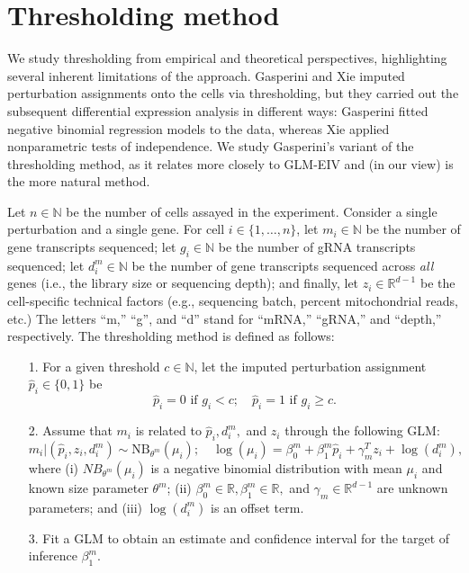 \documentclass[12pt]{article}
\begin{document}
\section{Thresholding method}
We study thresholding from empirical and theoretical perspectives, highlighting several inherent limitations of the approach. Gasperini and Xie imputed perturbation assignments onto the cells via thresholding, but they carried out the subsequent differential expression analysis in different ways: Gasperini fitted negative binomial regression models to the data, whereas Xie applied nonparametric tests of independence. We study Gasperini's variant of the thresholding method, as it relates more closely to GLM-EIV and (in our view) is the more natural method.

Let $n \in \mathbb{N}$ be the number of cells assayed in the experiment. Consider a single perturbation and a single gene. For cell $i \in \{1, \dots, n\}$, let $m_i \in \mathbb{N}$ be the number of gene transcripts sequenced; let $g_i \in \mathbb{N}$ be the number of gRNA transcripts sequenced; let $d^m_i \in \mathbb{N}$ be the number of gene transcripts sequenced across \textit{all} genes (i.e., the library size or sequencing depth); and finally, let $z_i \in \mathbb{R}^{d-1}$ be the cell-specific technical factors (e.g., sequencing batch, percent mitochondrial reads, etc.) The letters ``m,'' ``g'', and ``d'' stand for ``mRNA,'' ``gRNA,'' and ``depth,'' respectively. The thresholding method is defined as follows:
\begin{itemize}
	\item[1.] For a given threshold $c \in \mathbb{N}$, let the imputed perturbation assignment $\hat{p}_i \in \{0, 1\}$ be $$ \hat{p}_i = 0 \textrm{ if } g_i < c; \quad \hat{p}_i = 1 \textrm{ if } g_i \geq c.$$
	\item[2.] Assume that $m_i$ is related to $\hat{p}_i, d^m_i,$ and $z_i$ through the following GLM:
	\begin{equation}\label{thresh_glm}
	m_i | (\hat{p}_i, z_i, d^m_i) \sim \textrm{NB}_{\theta^m}(\mu_i); \quad
	\log(\mu_i) = \beta^m_0 + \beta^m_1 \hat{p}_i + \gamma^T_m z_i + \log\left(d_i^m\right),
	\end{equation}
	where (i) $NB_{\theta^m}(\mu_i)$ is a negative binomial distribution with mean $\mu_i$ and known size parameter $\theta^m$; (ii) $\beta^m_0 \in \mathbb{R}, \beta^m_1 \in \mathbb{R},$ and $\gamma_m \in  \mathbb{R}^{d-1}$ are unknown parameters; and (iii) $\log(d_i^m)$ is an offset term.
	
	\item[3.]  Fit a GLM to obtain an estimate and confidence interval for the target of inference $\beta^m_1$.
\end{itemize}
\end{document}
